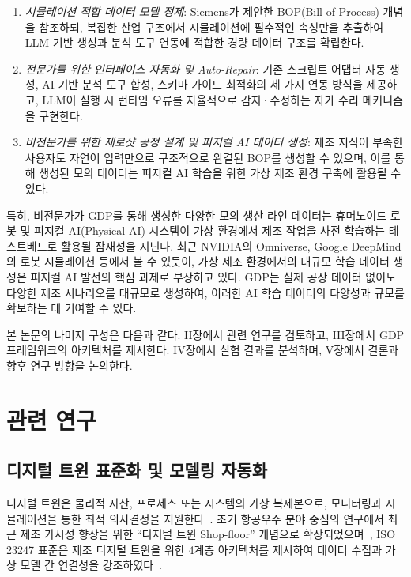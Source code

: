 \begin{enumerate}
\item \textit{시뮬레이션 적합 데이터 모델 정제}: Siemens가 제안한 BOP(Bill of Process) 개념을 참조하되, 복잡한 산업 구조에서 시뮬레이션에 필수적인 속성만을 추출하여 LLM 기반 생성과 분석 도구 연동에 적합한 경량 데이터 구조를 확립한다.

\item \textit{전문가를 위한 인터페이스 자동화 및 Auto-Repair}: 기존 스크립트 어댑터 자동 생성, AI 기반 분석 도구 합성, 스키마 가이드 최적화의 세 가지 연동 방식을 제공하고, LLM이 실행 시 런타임 오류를 자율적으로 감지·수정하는 자가 수리 메커니즘을 구현한다.

\item \textit{비전문가를 위한 제로샷 공정 설계 및 피지컬 AI 데이터 생성}: 제조 지식이 부족한 사용자도 자연어 입력만으로 구조적으로 완결된 BOP를 생성할 수 있으며, 이를 통해 생성된 모의 데이터는 피지컬 AI 학습을 위한 가상 제조 환경 구축에 활용될 수 있다.
\end{enumerate}

특히, 비전문가가 GDP를 통해 생성한 다양한 모의 생산 라인 데이터는 휴머노이드 로봇 및 피지컬 AI(Physical AI) 시스템이 가상 환경에서 제조 작업을 사전 학습하는 테스트베드로 활용될 잠재성을 지닌다. 최근 NVIDIA의 Omniverse, Google DeepMind의 로봇 시뮬레이션 등에서 볼 수 있듯이, 가상 제조 환경에서의 대규모 학습 데이터 생성은 피지컬 AI 발전의 핵심 과제로 부상하고 있다. GDP는 실제 공장 데이터 없이도 다양한 제조 시나리오를 대규모로 생성하여, 이러한 AI 학습 데이터의 다양성과 규모를 확보하는 데 기여할 수 있다.

본 논문의 나머지 구성은 다음과 같다. II장에서 관련 연구를 검토하고, III장에서 GDP 프레임워크의 아키텍처를 제시한다. IV장에서 실험 결과를 분석하며, V장에서 결론과 향후 연구 방향을 논의한다.

\section{관련 연구}
\label{sec:related}

\subsection{디지털 트윈 표준화 및 모델링 자동화}

디지털 트윈은 물리적 자산, 프로세스 또는 시스템의 가상 복제본으로, 모니터링과 시뮬레이션을 통한 최적 의사결정을 지원한다~\cite{b1}. 초기 항공우주 분야 중심의 연구에서 최근 제조 가시성 향상을 위한 ``디지털 트윈 Shop-floor'' 개념으로 확장되었으며~\cite{b2}, ISO 23247 표준은 제조 디지털 트윈을 위한 4계층 아키텍처를 제시하여 데이터 수집과 가상 모델 간 연결성을 강조하였다~\cite{b3}.

